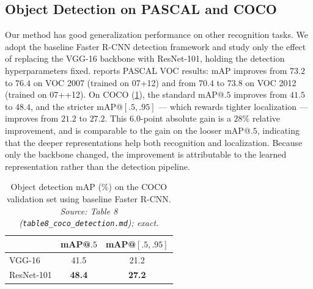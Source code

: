 \subsection{Object Detection on PASCAL and COCO}
\label{sec:detection}
Our method has good generalization performance on other recognition tasks. We
adopt the baseline Faster R-CNN detection framework and study only the effect of
replacing the VGG-16 backbone with ResNet-101, holding the detection
hyperparameters fixed.  reports PASCAL VOC results: mAP improves
from $73.2$ to $76.4$ on VOC 2007 (trained on 07+12) and from $70.4$ to $73.8$ on
VOC 2012 (trained on 07++12). On COCO (\cref{tab:coco}), the standard
mAP@$.5$ improves from $41.5$ to $48.4$, and the stricter mAP@$[.5,.95]$ --- which
rewards tighter localization --- improves from $21.2$ to $27.2$. This $6.0$-point
absolute gain is a $28\%$ relative improvement, and is comparable to the gain on
the looser mAP@$.5$, indicating that the deeper representations help both
recognition and localization. Because only the backbone changed, the improvement
is attributable to the learned representation rather than the detection pipeline.

\begin{table}[t]
\centering
\caption{Object detection mAP (\%) on the PASCAL VOC 2007/2012 test sets using
baseline Faster R-CNN. \emph{Source: Table 7
(\texttt{table7\_pascal\_voc\_detection.md}); exact.}}
\label{tab:voc}
\small
{}
\end{table}

\begin{table}[t]
\centering
\caption{Object detection mAP (\%) on the COCO validation set using baseline
Faster R-CNN. \emph{Source: Table 8 (\texttt{table8\_coco\_detection.md}); exact.}}
\label{tab:coco}
\small
\begin{tabular}{l c c}
\toprule
 & mAP@$.5$ & mAP@$[.5,.95]$ \\
\midrule
VGG-16     & 41.5 & 21.2 \\
ResNet-101 & \textbf{48.4} & \textbf{27.2} \\
\bottomrule
\end{tabular}
\end{table}
